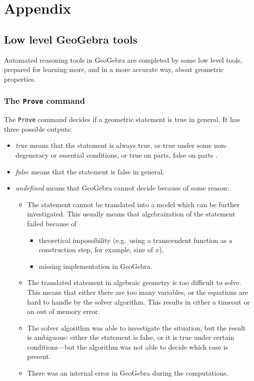 \documentclass{article}
\begin{document}
\section{Appendix}
\label{sec:Appendix}
\subsection{Low level GeoGebra tools}

Automated reasoning tools in GeoGebra are completed by some low level tools,  prepared for learning more,  and in a more accurate way,  about geometric properties.

\subsubsection{The \texttt{Prove} command}
The \texttt{Prove} command decides if a geometric statement is true in general. It has three possible outputs:
\begin{itemize}
    \item \textit{true} means that the statement is always true, or true under some non-degeneracy \cite{Chou,CoxLittleOShea,RecioVelez} or essential \cite{KovacsRecioSolyomGecse} conditions, or true on parts, false on parts 
\cite{BotanaRecio2016,KovacsRecioVelez}.
    \item \textit{false} means that the statement is false in general.
    \item \textit{undefined} means that GeoGebra cannot decide because of some reason:
    \begin{itemize}
        \item The statement cannot be translated into a model which can be further investigated. This usually means that algebraization of the statement failed because of 
        \begin{itemize}
            \item theoretical impossibility (e.g.~using a transcendent function as a construction step, for example, sine of $x$),
            \item missing implementation in GeoGebra.
        \end{itemize}
        \item The translated statement in algebraic geometry is too difficult to solve. This means that either there are too many variables, or the equations are hard to handle by the solver algorithm. This results in either a timeout or an out of memory error.
        \item The solver algorithm was able to investigate the situation, but the result is ambiguous: either the statement is false, or it is true under certain conditions---but the algorithm was not able to decide which case is present.
        \item There was an internal error in GeoGebra during the computations.
    \end{itemize}
\end{itemize}
\end{document}
